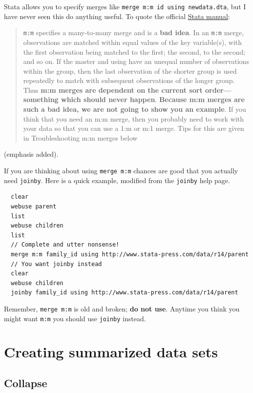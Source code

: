 \documentclass[]{book}
\begin{document}
Stata allows you to specify merges like \texttt{merge\ m:m\ id\ using\ newdata.dta}, but I have never seen this do anything useful. To quote the official \href{https://www.stata.com/manuals13/dmerge.pdf}{Stata manual}:

\begin{quote}
\texttt{m:m} specifies a many-to-many merge and is a \textbf{bad idea}. In an \texttt{m:m} merge, observations are matched within equal values of the key variable(s), with the first observation being matched to the first; the second, to the second; and so on. If the master and using have an unequal number of observations within the group, then the last observation of the shorter group is used repeatedly to match with subsequent observations of the longer group. Thus \textbf{m:m merges are dependent on the current sort order---something which should never happen}. \textbf{Because m:m merges are such a bad idea, we are not going to show you an example}. If you think that you need an m:m merge, then you probably need to work with your data so that you can use a 1:m or m:1 merge. Tips for this are given in Troubleshooting m:m merges below
\end{quote}

(emphasis added).

If you are thinking about using \texttt{merge\ m:m} chances are good that you actually need \texttt{joinby}. Here is a quick example, modified from the \texttt{joinby} help page.

\begin{verbatim}
  clear
  webuse parent
  list
  webuse children
  list
  // Complete and utter nonsense!
  merge m:m family_id using http://www.stata-press.com/data/r14/parent 
  // You want joinby instead
  clear
  webuse children
  joinby family_id using http://www.stata-press.com/data/r14/parent 
\end{verbatim}

Remember, \texttt{merge\ m:m} is old and broken; \textbf{do not use}. Anytime you think you might want \texttt{m:m} you should use \texttt{joinby} instead.

\hypertarget{creating-summarized-data-sets}{%
\section{Creating summarized data sets}\label{creating-summarized-data-sets}}

\hypertarget{collapse}{%
\subsection{Collapse}\label{collapse}}
\end{document}
